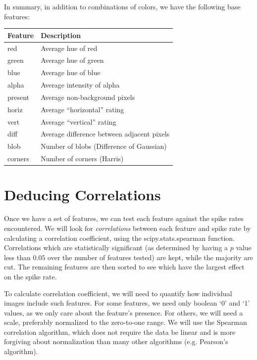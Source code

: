 \documentclass{scrartcl}
\begin{document}
In summary, in addition to combinations of colors, we have the following base
features:

\begin{center}
\begin{tabular}{| l | l |}
  \hline
  Feature & Description\\
  \hline
  red & Average hue of red\\
  green & Average hue of green\\
  blue & Average hue of blue\\
  alpha & Average intensity of alpha\\
  present & Average non-background pixels\\
  horiz & Average ``horizontal'' rating\\
  vert & Average ``vertical'' rating\\
  diff & Average difference between adjacent pixels\\
  blob & Number of blobs (Difference of Gaussian)\\
  corners & Number of corners (Harris)\\
  \hline
\end{tabular}
\end{center}

\section{Deducing Correlations}

Once we have a set of features, we can test each feature against the spike
rates encountered. We will look for {\em correlations} between each feature
and spike rate by calculating a correlation coefficient, using the
{\ttfamily scipy.stats.spearman} function. Correlations which are
statistically significant (as determined by having a $p$ value less than
$0.05$ over the number of features tested) are kept, while the majority are
cut. The remaining features are then sorted to see which have the largest
effect on the spike rate.

To calculate correlation coefficient, we will need to quantify how individual
images include such features. For some features, we need only boolean `0' and
`1' values, as we only care about the feature's presence. For others, we will
need a scale, preferably normalized to the zero-to-one range. We will use the
Spearman correlation algorithm, which does not require the data be linear and
is more forgiving about normalization than many other algorithms (e.g.
Pearson's algorithm).
\end{document}
